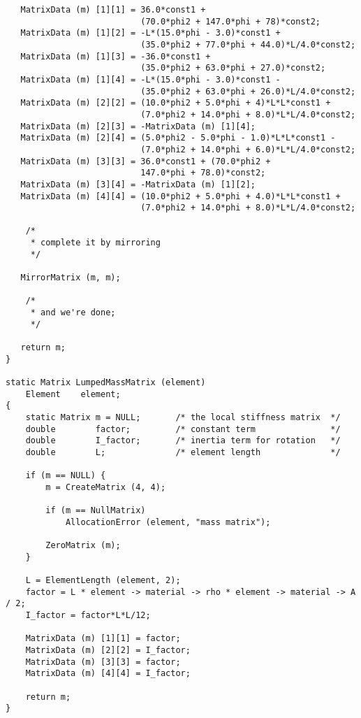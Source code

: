 \begin{screen}
\begin{verbatim}
   MatrixData (m) [1][1] = 36.0*const1 + 
                           (70.0*phi2 + 147.0*phi + 78)*const2;
   MatrixData (m) [1][2] = -L*(15.0*phi - 3.0)*const1 + 
                           (35.0*phi2 + 77.0*phi + 44.0)*L/4.0*const2;
   MatrixData (m) [1][3] = -36.0*const1 + 
                           (35.0*phi2 + 63.0*phi + 27.0)*const2;
   MatrixData (m) [1][4] = -L*(15.0*phi - 3.0)*const1 - 
                           (35.0*phi2 + 63.0*phi + 26.0)*L/4.0*const2;
   MatrixData (m) [2][2] = (10.0*phi2 + 5.0*phi + 4)*L*L*const1 +
                           (7.0*phi2 + 14.0*phi + 8.0)*L*L/4.0*const2;
   MatrixData (m) [2][3] = -MatrixData (m) [1][4];
   MatrixData (m) [2][4] = (5.0*phi2 - 5.0*phi - 1.0)*L*L*const1 -
                           (7.0*phi2 + 14.0*phi + 6.0)*L*L/4.0*const2;
   MatrixData (m) [3][3] = 36.0*const1 + (70.0*phi2 + 
                           147.0*phi + 78.0)*const2;
   MatrixData (m) [3][4] = -MatrixData (m) [1][2];
   MatrixData (m) [4][4] = (10.0*phi2 + 5.0*phi + 4.0)*L*L*const1 +
                           (7.0*phi2 + 14.0*phi + 8.0)*L*L/4.0*const2;

	/*	
	 * complete it by mirroring
	 */

   MirrorMatrix (m, m);

	/*
	 * and we're done;
	 */

   return m;
}

static Matrix LumpedMassMatrix (element)
    Element	   element;
{
    static Matrix m = NULL;       /* the local stiffness matrix	 */
    double        factor;         /* constant term               */
    double        I_factor;       /* inertia term for rotation   */
    double        L;              /* element length              */

    if (m == NULL) {
        m = CreateMatrix (4, 4);

        if (m == NullMatrix)
            AllocationError (element, "mass matrix");

        ZeroMatrix (m);
    }
    
    L = ElementLength (element, 2);
    factor = L * element -> material -> rho * element -> material -> A / 2;
    I_factor = factor*L*L/12;

    MatrixData (m) [1][1] = factor;
    MatrixData (m) [2][2] = I_factor;
    MatrixData (m) [3][3] = factor;
    MatrixData (m) [4][4] = I_factor;

    return m;
}
 \end{verbatim}
\end{screen}

